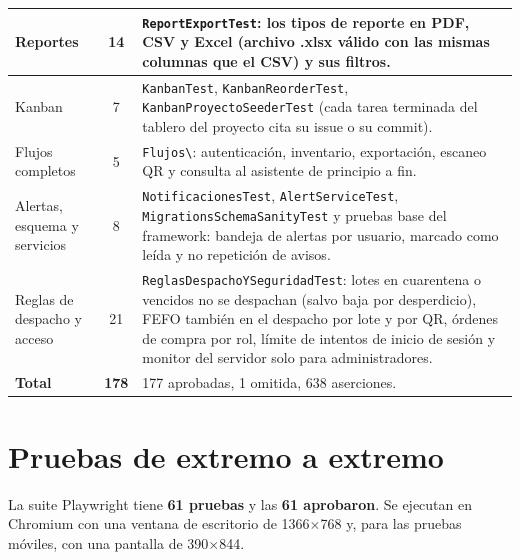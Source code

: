 \begin{longtable}{|p{3.4cm}|c|p{10cm}|}
Reportes & 14 & \texttt{ReportExportTest}: los tipos de reporte en PDF, CSV y Excel (archivo .xlsx válido con las mismas columnas que el CSV) y sus filtros. \\ \hline
Kanban & 7 & \texttt{KanbanTest}, \texttt{KanbanReorderTest}, \texttt{KanbanProyectoSeederTest} (cada tarea terminada del tablero del proyecto cita su issue o su commit). \\ \hline
Flujos completos & 5 & \texttt{Flujos\textbackslash *}: autenticación, inventario, exportación, escaneo QR y consulta al asistente de principio a fin. \\ \hline
Alertas, esquema y servicios & 8 & \texttt{NotificacionesTest}, \texttt{AlertServiceTest}, \texttt{MigrationsSchemaSanityTest} y pruebas base del framework: bandeja de alertas por usuario, marcado como leída y no repetición de avisos. \\ \hline
Reglas de despacho y acceso & 21 & \texttt{ReglasDespachoYSeguridadTest}: lotes en cuarentena o vencidos no se despachan (salvo baja por desperdicio), FEFO también en el despacho por lote y por QR, órdenes de compra por rol, límite de intentos de inicio de sesión y monitor del servidor solo para administradores. \\ \hline
\textbf{Total} & \textbf{178} & 177 aprobadas, 1 omitida, 638 aserciones. \\ \hline
\end{longtable}

\section{Pruebas de extremo a extremo}
\label{sec:pru_e2e}

La suite Playwright tiene \textbf{61 pruebas} y las \textbf{61 aprobaron}. Se ejecutan en Chromium con una ventana de escritorio de 1366$\times$768 y, para las pruebas móviles, con una pantalla de 390$\times$844.

